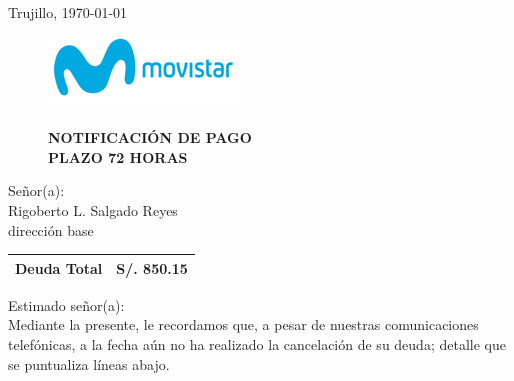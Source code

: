 %
%

\begin{flushright}
    Trujillo, \today
\end{flushright}
\vspace{-0.5cm}

\begin{figure}[h]
\begin{minipage}[b]{5.106458333cm}
\includegraphics[natwidth=5.106458333cm, natheight=1.931458333cm]{resources/business_logo.png}
\end{minipage}
\begin{minipage}[b][1.9314cm][t]{11cm}
\begin{flushright}
{\LARGE \bf NOTIFICACIÓN DE PAGO\\PLAZO 72 HORAS}
\end{flushright}
\end{minipage}
\end{figure}

\noindent
Señor(a):\\
Rigoberto L. Salgado Reyes\\
dirección base

\begin{flushright}
\bf \large
\begin{tabular}{|p{3.2cm} p{3.2cm}|}
\hline
Deuda Total & S/. 850.15 \\
\hline
\end{tabular}
\end{flushright}

\noindent
Estimado señor(a):\\
Mediante la presente, le recordamos que, a pesar de nuestras comunicaciones telefónicas, a la fecha aún no ha realizado la cancelación de su deuda; detalle que se puntualiza líneas abajo.

